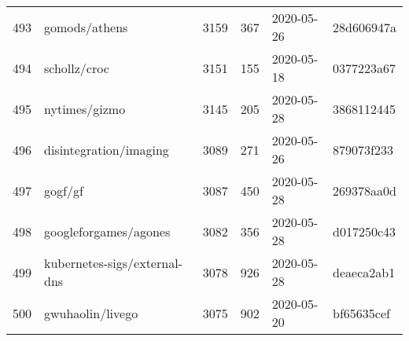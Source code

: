 \begin{longtable}{llrrll}
    493 &                                      gomods/athens &   3159 &    367 & 2020-05-26 &  28d606947a \\
    494 &                                       schollz/croc &   3151 &    155 & 2020-05-18 &  0377223a67 \\
    495 &                                      nytimes/gizmo &   3145 &    205 & 2020-05-28 &  3868112445 \\
    496 &                             disintegration/imaging &   3089 &    271 & 2020-05-26 &  879073f233 \\
    497 &                                            gogf/gf &   3087 &    450 & 2020-05-28 &  269378aa0d \\
    498 &                              googleforgames/agones &   3082 &    356 & 2020-05-28 &  d017250c43 \\
    499 &                       kubernetes-sigs/external-dns &   3078 &    926 & 2020-05-28 &  deaeca2ab1 \\
    500 &                                   gwuhaolin/livego &   3075 &    902 & 2020-05-20 &  bf65635cef \\
\end{longtable}
